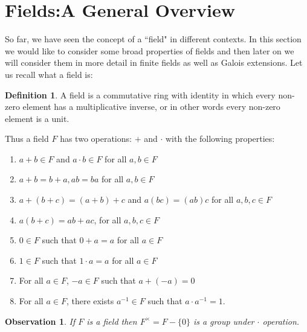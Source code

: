 \documentclass[12pt]{article}
\theoremstyle{plain}
\newtheorem{observation}{Observation}
\theoremstyle{definition}
\newtheorem{definition}{Definition}
\theoremstyle{remark}
\begin{document}
\section{Fields:A General Overview}
So far, we have seen the concept of a ``field" in different contexts. In this section we would like to consider some broad properties of fields and then later on we will consider them in more detail in finite fields as well as Galois extensions. Let us recall what a field is:
\begin{definition}
A field is a commutative ring with identity in which every non-zero element has a multiplicative inverse, or in other words every non-zero element is a unit. 
\end{definition}
Thus a field $F$ has two operations: $+$ and $\cdot$ with the following properties:
\begin{enumerate}
    \item $a+b\in F$ and $a\cdot b \in F$ for all $a,b\in F$
    \item $a+b=b+a, ab=ba$ for all $a,b\in F$
    \item $a+(b+c)=(a+b)+c$ and $a(bc) = (ab)c$ for all $a,b,c \in F$
    \item $a(b+c)=ab+ac$, for all $a,b,c \in F$
    \item $0\in F$ such that $0+a=a$ for all $a\in F$
    \item $1\in F$ such that $1\cdot a=a$ for all $a\in F$
    \item For all $a\in F$, $-a \in F$ such that $a+(-a)=0$
    \item For all $a \in F$, there exists $a^{-1}\in F$ such that $a\cdot a^{-1}=1$.
\end{enumerate}

\begin{observation}
If  $F$ is a field then $F^{\times} = F-\{0\}$ is a group under $\cdot$ operation.
\end{observation}
\end{document}
